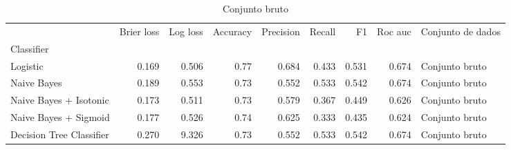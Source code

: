 \begin{table}
\centering
\caption{Conjunto bruto}
\label{Conjunto bruto 0}
\begin{tabular}{lrrrrrrrl}
\toprule
{} &  Brier  loss &  Log loss &  Accuracy  &  Precision  &  Recall  &    F1  &  Roc auc  & Conjunto de dados \\
Classifier               &              &           &            &             &          &        &           &                   \\
\midrule
Logistic                 &        0.169 &     0.506 &       0.77 &       0.684 &    0.433 &  0.531 &     0.674 &    Conjunto bruto \\
Naive Bayes              &        0.189 &     0.553 &       0.73 &       0.552 &    0.533 &  0.542 &     0.674 &    Conjunto bruto \\
Naive Bayes + Isotonic   &        0.173 &     0.511 &       0.73 &       0.579 &    0.367 &  0.449 &     0.626 &    Conjunto bruto \\
Naive Bayes + Sigmoid    &        0.177 &     0.526 &       0.74 &       0.625 &    0.333 &  0.435 &     0.624 &    Conjunto bruto \\
Decision Tree Classifier &        0.270 &     9.326 &       0.73 &       0.552 &    0.533 &  0.542 &     0.674 &    Conjunto bruto \\
\bottomrule
\end{tabular}
\end{table}
